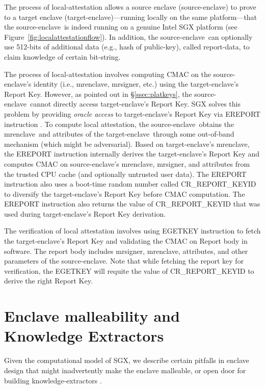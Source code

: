 \documentclass[10pt, letterpaper]{article}
\newcommand{\secref}[1]{\S\ref{#1}}
\newcommand{\mrenclave}{\textsf{mrenclave}}
\newcommand{\mrsigner}{\textsf{mrsigner}}
\newcommand{\se}{source-enclave}
\newcommand{\te}{target-enclave}
\begin{document}
  The process of local-attestation allows a source enclave (\se) to
  prove to a target enclave (\te)---running locally on the same
  platform---that the \se\ is indeed running on a genuine Intel SGX
  platform (see Figure~\ref{fig:localattestationflow}). In addition,
  the \se\ can optionally use 512-bits of additional data (e.g., hash
  of public-key), called report-data, to claim knowledge of certain
  bit-string.

  The process of local-attestation involves computing CMAC
  \cite{aescmac} on the \se's identity (i.e., \mrenclave, \mrsigner,
  etc.) using the \te's Report Key. However, as pointed out in
  \secref{ssec:platkeys}, the \se\ cannot directly access \te's Report
  Key. SGX solves this problem by providing \textit{oracle access} to
  \te's Report Key via \textsf{EREPORT} instruction
  \cite[\S14.4.1]{intelsdm}. To compute local attestation, the
  \se\ obtains the \mrenclave\ and attributes of the \te\ through some
  out-of-band mechanism (which might be adversarial). Based on \te's
  \mrenclave, the \textsf{EREPORT} instruction internally derives the
  \te's Report Key and computes \textsf{CMAC} on \se's \mrenclave,
  \mrsigner, and attributes from the trusted CPU cache (and optionally
  untrusted user data).  The \textsf{EREPORT} instruction also uses a
  boot-time random number called \textsf{CR\_REPORT\_KEYID} to
  diversify the \te's Report Key before \textsf{CMAC} computation. The
  \textsf{EREPORT} instruction also returns the value of
  \textsf{CR\_REPORT\_KEYID} that was used during \te's Report Key
  derivation.

  The verification of local attestation involves using \textsf{EGETKEY}
  instruction to fetch the \te's Report Key and validating the
  \textsf{CMAC} on Report body in software.  The report body includes
  \mrsigner, \mrenclave, attributes, and other parameters of the
  \se. Note that while fetching the report key for verification, the
  \textsf{EGETKEY} will requite the value of
  \textsf{CR\_REPORT\_KEYID} to derive the right Report Key.

  \section{Enclave malleability and Knowledge Extractors}
  \label{sec:analysisfwk}

  Given the computational model of SGX, we describe certain pitfalls
  in enclave design that might inadvertently make the enclave
  malleable, or open door for building knowledge-extractors
  \cite{BellarePOK}.
\end{document}
